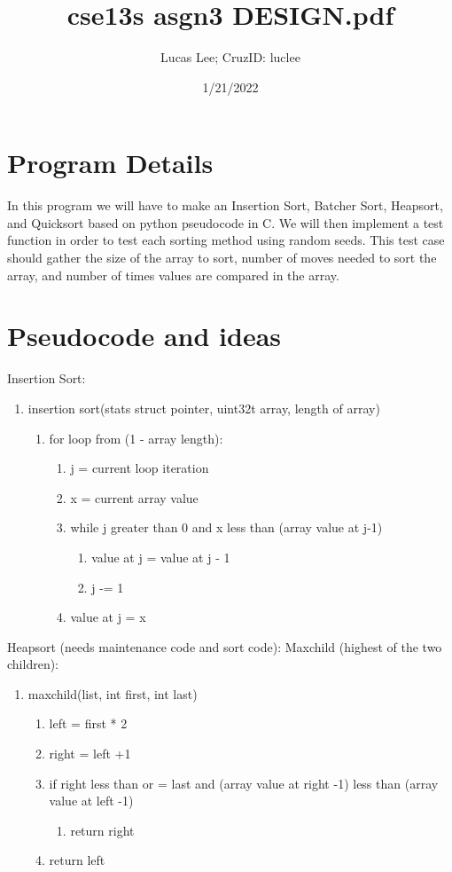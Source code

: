 \documentclass[11pt]{article}
\title{cse13s asgn3 DESIGN.pdf}
\author{Lucas Lee; CruzID: luclee}
\date{1/21/2022}
\begin{document}
\maketitle

\section{Program Details}\label{ss:details}
In this program we will have to make an Insertion Sort, Batcher Sort, Heapsort, and Quicksort based on python pseudocode in C. We will then implement a test function in order to test each sorting method using random seeds. This test case should gather the size of the array to sort, number of moves needed to sort the array, and number of times values are compared in the array.

\section{Pseudocode and ideas}\label{ss:pseudocode}
Insertion Sort:
\begin{enumerate}
\item insertion sort(stats struct pointer, uint32t array, length of array)
	\begin{enumerate}
	\item for loop from (1 - array length):
		\begin{enumerate}
		\item j = current loop iteration
		\item x = current array value
		\item while j greater than 0 and x less than (array value at j-1)
			\begin{enumerate}
			\item value at j = value at j - 1
			\item j -= 1
			\end{enumerate}
		\item value at j = x
		\end{enumerate}
	\end{enumerate}
\end{enumerate}

Heapsort (needs maintenance code and sort code):
Maxchild (highest of the two children):
\begin{enumerate}
\item maxchild(list, int first, int last)
	\begin{enumerate}
	\item left = first * 2
	\item right = left +1
	\item if right less than or = last and (array value at right -1) less than (array value at left -1)
		\begin{enumerate}
		\item return right
		\end{enumerate}
	\item return left
	\end{enumerate}
\end{enumerate}
\end{document}
